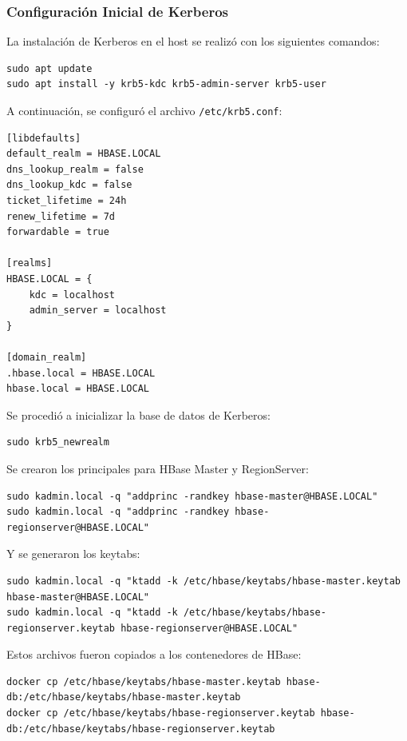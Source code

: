 \documentclass{article}
\begin{document}
\subsubsection{Configuración Inicial de Kerberos}

La instalación de Kerberos en el host se realizó con los siguientes comandos:

\begin{lstlisting}[style=bashStyle]
sudo apt update
sudo apt install -y krb5-kdc krb5-admin-server krb5-user
\end{lstlisting}

A continuación, se configuró el archivo \texttt{/etc/krb5.conf}:

\begin{verbatim}
[libdefaults]
default_realm = HBASE.LOCAL
dns_lookup_realm = false
dns_lookup_kdc = false
ticket_lifetime = 24h
renew_lifetime = 7d
forwardable = true

[realms]
HBASE.LOCAL = {
    kdc = localhost
    admin_server = localhost
}

[domain_realm]
.hbase.local = HBASE.LOCAL
hbase.local = HBASE.LOCAL
\end{verbatim}

Se procedió a inicializar la base de datos de Kerberos:

\begin{lstlisting}[style=bashStyle]
sudo krb5_newrealm
\end{lstlisting}

\newpage
Se crearon los principales para HBase Master y RegionServer:

\begin{lstlisting}[style=bashStyle]
sudo kadmin.local -q "addprinc -randkey hbase-master@HBASE.LOCAL"
sudo kadmin.local -q "addprinc -randkey hbase-regionserver@HBASE.LOCAL"
\end{lstlisting}


Y se generaron los keytabs:

\begin{lstlisting}[style=bashStyle]
sudo kadmin.local -q "ktadd -k /etc/hbase/keytabs/hbase-master.keytab hbase-master@HBASE.LOCAL"
sudo kadmin.local -q "ktadd -k /etc/hbase/keytabs/hbase-regionserver.keytab hbase-regionserver@HBASE.LOCAL"
\end{lstlisting}

Estos archivos fueron copiados a los contenedores de HBase:

\begin{lstlisting}[style=bashStyle]
docker cp /etc/hbase/keytabs/hbase-master.keytab hbase-db:/etc/hbase/keytabs/hbase-master.keytab
docker cp /etc/hbase/keytabs/hbase-regionserver.keytab hbase-db:/etc/hbase/keytabs/hbase-regionserver.keytab
\end{lstlisting}
\end{document}
